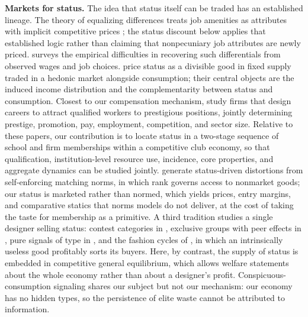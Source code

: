 \documentclass[12pt,letterpaper]{article}
\theoremstyle{definition}
\begin{document}
\textbf{Markets for status.}
The idea that status itself can be traded has an established lineage.
The theory of equalizing differences treats job amenities as attributes with implicit competitive prices \citep{rosen1974hedonic,rosen1986equalizing}; the status discount below applies that established logic rather than claiming that nonpecuniary job attributes are newly priced.
\citet{lavetti2023compensating} surveys the empirical difficulties in recovering such differentials from observed wages and job choices.
\citet{beckermurphywerning2005} price status as a divisible good in fixed supply traded in a hedonic market alongside consumption; their central objects are the induced income distribution and the complementarity between status and consumption.
Closest to our compensation mechanism, \citet{ferreiranikolowa2024} study firms that design careers to attract qualified workers to prestigious positions, jointly determining prestige, promotion, pay, employment, competition, and sector size.
Relative to these papers, our contribution is to locate status in a two-stage sequence of school and firm memberships within a competitive club economy, so that qualification, institution-level resource use, incidence, core properties, and aggregate dynamics can be studied jointly.
\citet{colemailathpostlewaite1992} generate status-driven distortions from self-enforcing matching norms, in which rank governs access to nonmarket goods; our status is marketed rather than normed, which yields prices, entry margins, and comparative statics that norms models do not deliver, at the cost of taking the taste for membership as a primitive.
A third tradition studies a single designer selling status: contest categories in \citet{moldovanuselashi2007}, exclusive groups with peer effects in \citet{board2009group}, pure signals of type in \citet{rayo2013signal}, and the fashion cycles of \citet{pesendorfer1995fashion}, in which an intrinsically useless good profitably sorts its buyers.
Here, by contrast, the supply of status is embedded in competitive general equilibrium, which allows welfare statements about the whole economy rather than about a designer's profit.
Conspicuous-consumption signaling \citep{bagwellbernheim1996veblen} shares our subject but not our mechanism: our economy has no hidden types, so the persistence of elite waste cannot be attributed to information.
\end{document}

